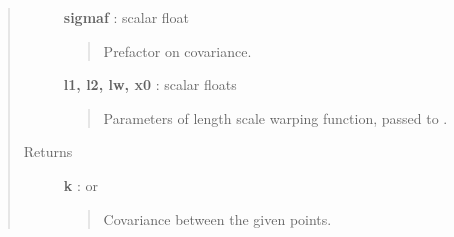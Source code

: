 \documentclass[letterpaper,10pt,english]{sphinxmanual}
\begin{document}
\begin{fulllineitems}
\begin{fulllineitems}
\begin{quote}
\begin{description}
\textbf{sigmaf} : scalar float
\begin{quote}

Prefactor on covariance.
\end{quote}

\textbf{l1, l2, lw, x0} : scalar floats
\begin{quote}

Parameters of length scale warping function, passed to
.
\end{quote}

\item[{Returns}] \leavevmode
\textbf{k} :  or 
\begin{quote}

Covariance between the given points.
\end{quote}

\end{description}\end{quote}

\end{fulllineitems}


\end{fulllineitems}

\end{document}
